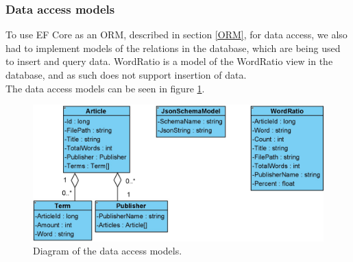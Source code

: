 \subsubsection*{Data access models}
To use EF Core as an ORM, described in section \ref{ORM}, for data access, we also had to implement models of the relations in the database, which are being used to insert and query data. 
WordRatio is a model of the WordRatio view in the database, and as such does not support insertion of data.
\\
The data access models can be seen in figure \ref*{fig:DataAccesModels}. 
\begin{figure}[H]
    \centering
    \includegraphics[scale=0.4]{Images/DataAccessModels.jpg}
    \caption{Diagram of the data access models.}
    \label{fig:DataAccesModels}
\end{figure}